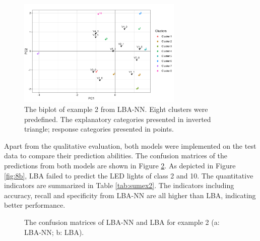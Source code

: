 \documentclass[]{interact}
\theoremstyle{plain}%
\theoremstyle{definition}
\theoremstyle{remark}
\begin{document}
\begin{figure}[H]
\centering
\includegraphics[width=0.7\textwidth]{figure/7_biplot_example_2.png}
\caption{The biplot of example 2 from LBA-NN. Eight clusters were predefined. The explanatory categories presented in inverted triangle; response categories presented in points.
\label{fig:bipex2}}
\end{figure}

Apart from the qualitative evaluation, both models were implemented on
the test data to compare their prediction abilities. The confusion
matrices of the predictions from both models are shown in Figure
\ref{fig:8}. As depicted in Figure \ref{fig:8b}, LBA failed to predict
the LED lights of class 2 and 10. The quantitative indicators are
summarized in Table \ref{tab:sumex2}. The indicators including accuracy,
recall and specificity from LBA-NN are all higher than LBA, indicating
better performance.

\begin{figure}[H]
\caption{The confusion matrices of LBA-NN and LBA for example 2 (a: LBA-NN; b: LBA). \label{fig:8}}
\end{figure}
\end{document}
